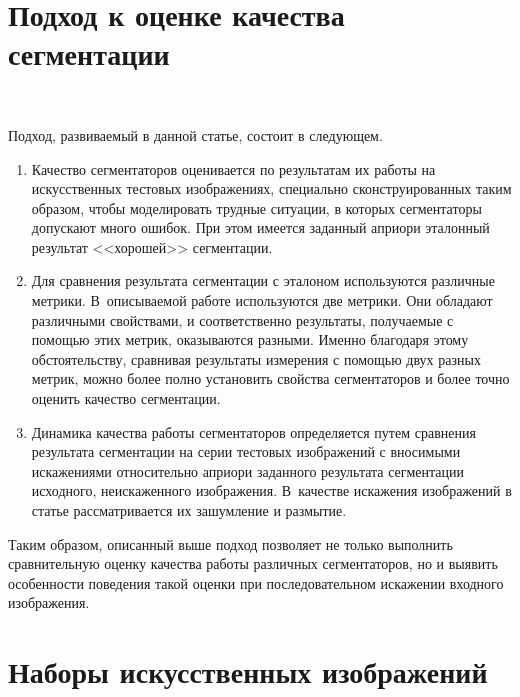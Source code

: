 \begin{multicols}{2}
  \vspace*{-6pt}
  
  \section{Подход к оценке качества сегментации}

 \begin{figure*}[b] %
\vspace*{9pt}
\begin{center}
\mbox{%
\epsfxsize=141.364mm
}
\end{center}
\vspace*{-6pt}
\end{figure*}

  Подход, развиваемый в данной статье, состоит в следующем.
  \begin{enumerate}[1.]
\item Качество сегментаторов оценивается по результатам их работы на 
искусственных тестовых изображениях, специально сконструированных 
таким образом, чтобы моделировать трудные ситуации, в которых 
сегментаторы допускают много ошибок. При этом имеется заданный априори 
эталонный результат <<хорошей>> сегментации.
\item Для сравнения результата сегментации с эталоном используются 
различные метрики. В~описываемой работе используются две метрики. Они 
обладают различными свойствами, и соответственно результаты, 
получаемые с помощью этих метрик, оказываются разными. Именно 
благодаря этому обстоятельству, сравнивая результаты измерения с 
помощью двух разных мет\-рик, можно более полно установить свойства 
сегментаторов и более точно оценить качество сегментации.
\item Динамика качества работы сегментаторов определяется путем 
сравнения результата сегментации на серии тестовых изображений с 
вносимыми искажениями относительно априори заданного результата 
сегментации исходного, неискаженного изображения. В~качестве искажения 
изображений в статье рассматривается их зашумление и размытие.
   \end{enumerate}
   
   Таким образом, описанный выше подход позволяет не только выполнить 
сравнительную оценку качества работы различных сегментаторов, но и 
выявить особенности поведения такой оценки при последовательном 
искажении входного изображения.
  
  \section{Наборы искусственных изображений}
  

\end{multicols}
